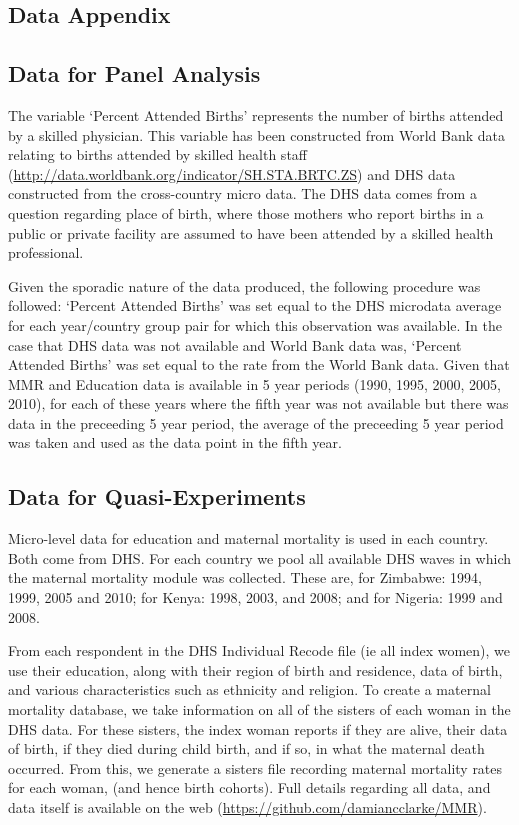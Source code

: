 \documentclass{article}[12pt,subeqn]
\begin{document}
\begin{spacing}{1.4}
\section{Data Appendix}
\label{scn:dataappendix}
\subsection{Data for Panel Analysis}
The variable `Percent Attended Births' represents the number of births attended 
by a skilled physician.  This variable has been constructed from World Bank data 
relating to births attended by skilled health staff 
(\url{http://data.worldbank.org/indicator/SH.STA.BRTC.ZS}) and DHS data 
constructed from the cross-country micro data. The DHS data comes from a 
question regarding place of birth, where those mothers who report births in a 
public or private facility are assumed to have been attended by a skilled health 
professional.  

Given the sporadic nature of the data produced, the following procedure was 
followed: `Percent Attended Births' was set equal to the DHS microdata average 
for each year/country group pair for which this observation was available.  In 
the case that DHS data was not available and World Bank data was, `Percent 
Attended Births' was set equal to the rate from the World Bank data.  Given that 
MMR and Education data is available in 5 year periods (1990, 1995, 2000, 2005, 
2010), for each of these years where the fifth year was not available but there 
was data in the preceeding 5 year period, the average of the preceeding 5 year 
period was taken and used as the data point in the fifth year.

\subsection{Data for Quasi-Experiments}
Micro-level data for education and maternal mortality is used in each country.
Both come from DHS.  For each country we pool all available DHS waves in which
the maternal mortality module was collected.  These are, for Zimbabwe: 1994, 
1999, 2005 and 2010; for Kenya: 1998, 2003, and 2008; and for Nigeria: 1999 and
2008.

From each respondent in the DHS Individual Recode file (ie all index women), we
use their education, along with their region of birth and residence, data of 
birth, and various characteristics such as ethnicity and religion.  To create a
maternal mortality database, we take information on all of the sisters of each
woman in the DHS data.  For these sisters, the index woman reports if they are
alive, their data of birth, if they died during child birth, and if so, in what 
the maternal death occurred.  From this, we generate a sisters file recording 
maternal mortality rates for each woman, (and hence birth cohorts). Full details
regarding all data, and data itself is available on the web
(\url{https://github.com/damiancclarke/MMR}).


\end{spacing}
\end{document}
